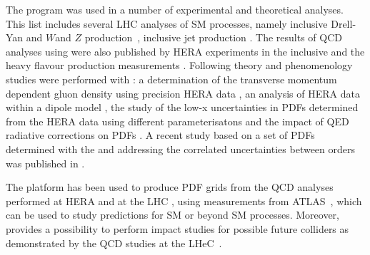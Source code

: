 The \fitter program was used in a number of experimental and theoretical analyses. 
This list includes several LHC analyses of SM processes, namely
inclusive Drell-Yan and $W$and $Z$ production~\cite{atlas:strange,atlas:hm,cms:strange},
inclusive jet production \cite{atlas:jets}.
The results of QCD analyses using \fitter were also
published by HERA experiments in the inclusive \cite{h1:2012kk} and
the heavy flavour production measurements \cite{h1zeus:charm, Abramowicz:2014zub}.
Following theory and phenomenology studies were performed with \fitter:
a determination of the transverse momentum dependent gluon density using precision HERA data \cite{Jung2014}, 
an analysis of HERA data within a dipole model \cite{Luszczak:2013rxa},
the study of the low-x uncertainties in PDFs determined from the HERA data using 
different parameterisatons \cite{Chebyshev} and the impact of QED radiative corrections on PDFs \cite{Sadykov:2014aua}.
A recent study based on a set of PDFs determined with the \fitter and addressing 
the correlated uncertainties between orders was published in \cite{hfcorrpaper}. 
%

The \fitter platform has been used to produce PDF grids from the QCD analyses performed at 
HERA \cite{h1zeus:2009wt,hera:grids} and at the LHC \cite{atlas:grids}, using 
measurements from ATLAS~\cite{atlas:strange,atlas:jets}, which can be used to study predictions for SM 
or beyond SM processes.  Moreover, \fitter provides a possibility to 
perform impact studies for possible future colliders
as demonstrated by the QCD studies at the LHeC~\cite{lhec:studies}.







